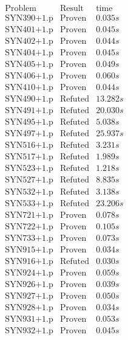 \documentclass[a4paper,11pt]{report}
\theoremstyle{definition}
\theoremstyle{definition}
\theoremstyle{definition}
\theoremstyle{definition}
\theoremstyle{definition}
\theoremstyle{definition}
\theoremstyle{definition}
\begin{document}
	\begin{minipage}{0.45\textwidth}
		\[\begin{matrix}
			\text{Problem}&\text{Result}&\text{time}\\
			\text{SYN390+1.p}&\text{Proven}& 0.035 s\\
			\text{SYN401+1.p}&\text{Proven}& 0.045 s\\
			\text{SYN402+1.p}&\text{Proven}& 0.044 s\\
			\text{SYN404+1.p}&\text{Proven}& 0.045 s\\
			\text{SYN405+1.p}&\text{Proven}& 0.049 s\\
			\text{SYN406+1.p}&\text{Proven}& 0.060 s\\
			\text{SYN410+1.p}&\text{Proven}& 0.044 s\\
			\text{SYN490+1.p}&\text{Refuted}& 13.282 s\\
			\text{SYN491+1.p}&\text{Refuted}& 20.030 s\\
			\text{SYN495+1.p}&\text{Refuted}& 5.038 s\\
			\text{SYN497+1.p}&\text{Refuted}& 25.937 s\\
			\text{SYN516+1.p}&\text{Refuted}& 3.231 s\\
			\text{SYN517+1.p}&\text{Refuted}& 1.989 s\\
			\text{SYN523+1.p}&\text{Refuted}& 1.218 s\\
			\text{SYN527+1.p}&\text{Refuted}& 8.835 s\\
			\text{SYN532+1.p}&\text{Refuted}& 3.138 s\\
			\text{SYN533+1.p}&\text{Refuted}& 23.206 s\\
			\text{SYN721+1.p}&\text{Proven}& 0.078 s\\
			\text{SYN722+1.p}&\text{Proven}& 0.105 s\\
			\text{SYN733+1.p}&\text{Proven}& 0.073 s\\
			\text{SYN915+1.p}&\text{Proven}& 0.034 s\\
			\text{SYN916+1.p}&\text{Refuted}& 0.030 s\\
			\text{SYN924+1.p}&\text{Proven}& 0.059 s\\
			\text{SYN926+1.p}&\text{Proven}& 0.039 s\\
			\text{SYN927+1.p}&\text{Proven}& 0.050 s\\
			\text{SYN928+1.p}&\text{Proven}& 0.034 s\\
			\text{SYN931+1.p}&\text{Proven}& 0.053 s\\
			\text{SYN932+1.p}&\text{Proven}& 0.045 s\\

\end{matrix}\]
\end{minipage}
\end{document}
